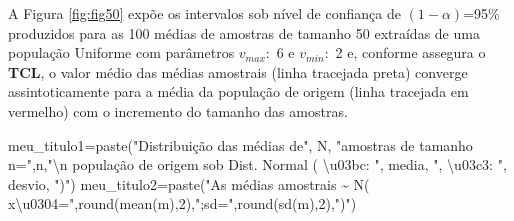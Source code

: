 \documentclass[
]{book}
\newenvironment{Shaded}{\begin{snugshade}}{\end{snugshade}}
\newcommand{\DecValTok}[1]{\textcolor[rgb]{0.00,0.00,0.81}{#1}}
\newcommand{\FunctionTok}[1]{\textcolor[rgb]{0.00,0.00,0.00}{#1}}
\newcommand{\NormalTok}[1]{#1}
\newcommand{\OtherTok}[1]{\textcolor[rgb]{0.56,0.35,0.01}{#1}}
\newcommand{\SpecialCharTok}[1]{\textcolor[rgb]{0.00,0.00,0.00}{#1}}
\newcommand{\StringTok}[1]{\textcolor[rgb]{0.31,0.60,0.02}{#1}}
\begin{document}
\hfill\break

A Figura \ref{fig:fig50} expõe os intervalos sob nível de confiança de \((1-\alpha)\)=95\% produzidos para as 100 médias de amostras de tamanho 50 extraídas de uma população Uniforme com parâmetros \(v_{max}:\) 6 e \(v_{min}:\) 2 e, conforme assegura o \textbf{TCL}, o valor médio das médias amostrais (linha tracejada preta) converge assintoticamente para a média da população de origem (linha tracejada em vermelho) com o incremento do tamanho das amostras.

\hfill\break

\begin{Shaded}
\begin{Highlighting}[]
\NormalTok{meu\_titulo1}\OtherTok{=}\FunctionTok{paste}\NormalTok{(}\StringTok{"Distribuição das médias de"}\NormalTok{, N, }\StringTok{"amostras de tamanho n="}\NormalTok{,n,}\StringTok{"}\SpecialCharTok{\textbackslash{}n}\StringTok{ população de origem sob Dist. Normal ( \textbackslash{}u03bc: "}\NormalTok{, media, }\StringTok{", \textbackslash{}u03c3: "}\NormalTok{, desvio, }\StringTok{")"}\NormalTok{)}
\NormalTok{meu\_titulo2}\OtherTok{=}\FunctionTok{paste}\NormalTok{(}\StringTok{"As médias amostrais \textasciitilde{} N( x\textbackslash{}u0304="}\NormalTok{,}\FunctionTok{round}\NormalTok{(}\FunctionTok{mean}\NormalTok{(m),}\DecValTok{2}\NormalTok{),}\StringTok{";sd="}\NormalTok{,}\FunctionTok{round}\NormalTok{(}\FunctionTok{sd}\NormalTok{(m),}\DecValTok{2}\NormalTok{),}\StringTok{")"}\NormalTok{)}


\end{Highlighting}
\end{Shaded}
\end{document}
